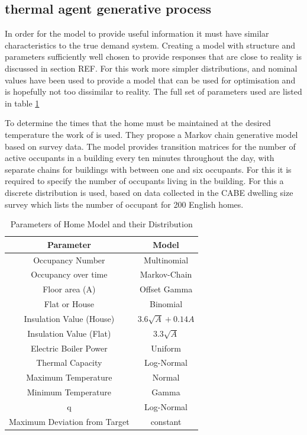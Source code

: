 \documentclass[a4paper, 10 pt, conference]{ieeeconf}  %
\begin{document}
\subsection{thermal agent generative process}
In order for the model to provide useful information it must have similar characteristics to the true demand system. Creating a model with structure and parameters sufficiently well chosen to provide responses that are close to reality is discussed in section REF. For this work more simpler distributions, and nominal values have been used to provide a model that can be used for optimisation and is hopefully not too dissimilar to reality. The full set of parameters used are listed in table \ref{modelpara}

To determine the times that the home must be maintained at the desired temperature the work of \cite{richardson2008high} is used. They propose a Markov chain generative model based on survey data. The model provides transition matrices for the number of active occupants in a building every ten minutes throughout the day, with separate chains for buildings with between one and six occupants. For this it is required to specify the number of occupants living in the building. For this a discrete distribution is used, based on data collected in the CABE dwelling size survey \cite{CABE} which lists the number of occupant for 200 English homes.

\begin{table}[h]
\caption{Parameters of Home Model and their Distribution}
\label{modelpara}
\begin{center}
\begin{tabular}{|c||c|}
\hline
Parameter & Model\\
\hline \hline
Occupancy Number & Multinomial \\
\hline
Occupancy over time & Markov-Chain \\
\hline
Floor area (A) & Offset Gamma \\
\hline
Flat or House & Binomial  \\
\hline
Insulation Value (House) & $3.6\sqrt{A}+0.14A$\\
\hline
Insulation Value (Flat) & $3.3\sqrt{A}$\\
\hline
Electric Boiler Power & Uniform\\
\hline
Thermal Capacity & Log-Normal  \\
\hline
Maximum Temperature & Normal \\
\hline
Minimum Temperature & Gamma \\
\hline
q & Log-Normal \\
\hline
Maximum Deviation from Target & constant \\
\hline
\end{tabular}
\end{center}
\end{table}
\end{document}
